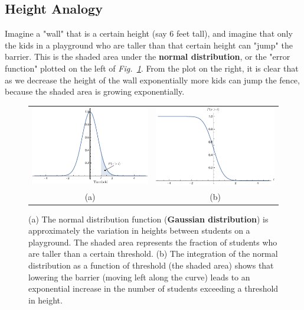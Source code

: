 \subsection{Height Analogy}
Imagine a "wall" that is a certain height (say 6 feet tall), and imagine that only the kids in a playground who are taller than that certain height can "jump" the barrier.  This is the shaded area under the \textbf{normal distribution}, or the "error function" plotted on the left of \emph{Fig.~\ref{fig:norm4}}.  From the plot on the right, it is clear that as we decrease the height of the wall exponentially more kids can jump the fence, because the shaded area is growing exponentially.  
\begin{figure}[H]
\centering
\begin{tabular}{cc}
\includegraphics[width=.45\columnwidth]{norm4} &
\includegraphics[width=.45\columnwidth]{erf}\\
(a) & (b)\\
\end{tabular}
\caption{(a) The normal distribution function (\textbf{Gaussian distribution}) is approximately the variation in heights between students on a playground.  The shaded area represents the fraction of students who are taller than a certain threshold.  (b) The integration of the normal distribution as a function of threshold (the shaded area) shows that lowering the barrier (moving left along the curve) leads to an exponential increase in the number of students exceeding a threshold in height.}
\label{fig:norm4}
\end{figure}
\newpage
